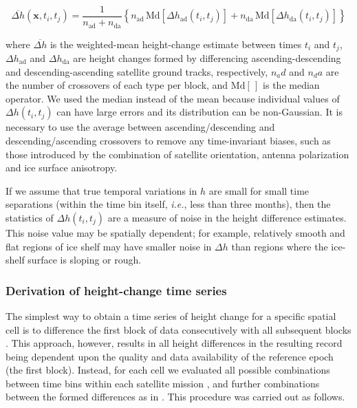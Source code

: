 \begin{equation}
  \overbar{\Delta h}(\mathbf{x}, t_i, t_j) = \frac{1}{n_\text{ad} + n_\text{da}} 
  \left\{
  n_\text{ad} \, \text{Md}\!\left[ \Delta h_\text{ad}(t_i, t_j) \right] +
  n_\text{da} \, \text{Md}\!\left[ \Delta h_\text{da}(t_i, t_j) \right]
  \right\}
  \label{c2e1}
\end{equation}

\noindent
where $\overbar{\Delta h}$ is the weighted-mean height-change estimate between times $t_i$ and $t_j$, $\Delta h_\text{ad}$ and $\Delta h_\text{da}$ are height changes formed by differencing ascending-descending and descending-ascending satellite ground tracks, respectively, $n_ad$ and $n_da$ are the number of crossovers of each type per block, and $\text{Md}[\,]$ is the median operator. We used the median instead of the mean because individual values of $\Delta h(t_i,t_j)$ can have large errors and its distribution can be non-Gaussian. It is necessary to use the average between ascending/descending and descending/ascending crossovers to remove any time-invariant biases, such as those introduced by the combination of satellite orientation, antenna polarization and ice surface anisotropy.

If we assume that true temporal variations in $h$ are small for small time separations (within the time bin itself, {\it i.e.}, less than three months), then the statistics of $\Delta h(t_i,t_j)$ are a measure of noise in the height difference estimates. This noise value may be spatially dependent; for example, relatively smooth and flat regions of ice shelf may have smaller noise in $\Delta h$ than regions where the ice-shelf surface is sloping or rough.

\subsubsection{Derivation of height-change time series}

The simplest way to obtain a time series of height change for a specific spatial cell is to difference the first block of data consecutively with all subsequent blocks \parencite[E.G.,]{Zwally1989}. This approach, however, results in all height differences in the resulting record being dependent upon the quality and data availability of the reference epoch (the first block). Instead, for each cell we evaluated all possible combinations between time bins within each satellite mission \parencite{Li2006}, and further combinations between the formed differences as in \textcite{Khvorostovsky2012}. This procedure was carried out as follows.

